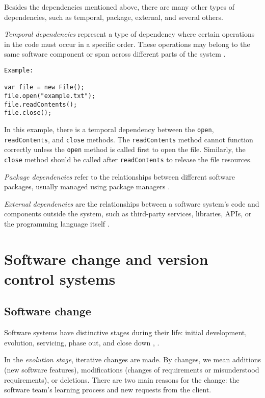 \hspace{4em} Besides the dependencies mentioned above, there are many other types of dependencies, such as temporal, package, external, and several others.

\textit{Temporal dependencies} represent a type of dependency where certain operations in the code must occur in a specific order. These operations may belong to the same software component or span across different parts of the system \cite{Cataldo2009SoftwareDW}.

\begin{verbatim}
Example:

var file = new File();
file.open("example.txt");
file.readContents();
file.close();
\end{verbatim}

In this example, there is a temporal dependency between the \texttt{open}, \texttt{readContents}, and \texttt{close} methods. The \texttt{readContents} method cannot function correctly unless the \texttt{open} method is called first to open the file. Similarly, the \texttt{close} method should be called after \texttt{readContents} to release the file resources.


\textit{Package dependencies} refer to the relationships between different software packages, usually managed using package managers \cite{dep-package}.

\textit{External dependencies} are the relationships between a software system's code and components outside the system, such as third-party services, libraries, APIs, or the programming language itself \cite{dep-external}.






\section{Software change and version control systems}

\subsection{Software change}
\label{change}

\hspace{4em}Software systems have distinctive stages during their life: initial development, evolution, servicing, phase out, and close down \cite{Software-life-cycle}, \cite{model-bennett}.

In the \textit{evolution stage}, iterative changes are made. By changes, we mean additions (new software features), modifications (changes of requirements or misunderstood requirements), or deletions. There are two main reasons for the change: the software team's learning process and new requests from the client.

